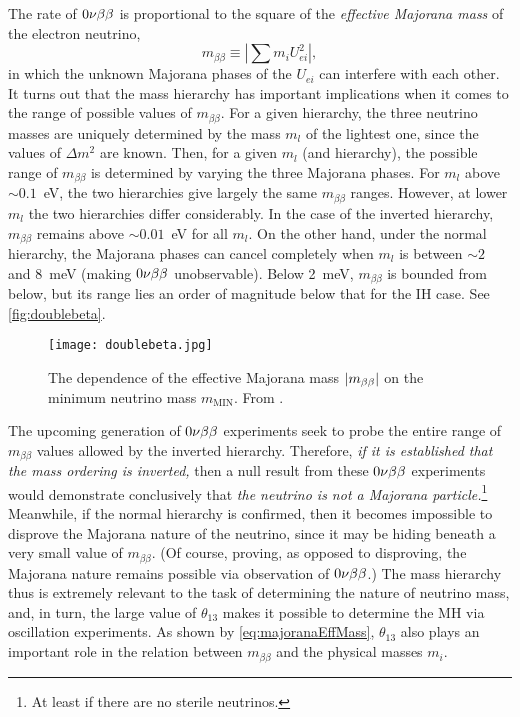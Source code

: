 \documentclass[../thesis.tex]{subfiles}
\begin{document}
The rate of $0\nu\beta\beta$ is proportional to the square of the \emph{effective Majorana mass} of the electron neutrino,
\begin{equation}
  m_{\beta\beta} \equiv \left| \sum m_i U^2_{ei} \right|,
  \label{eq:majoranaEffMass}
\end{equation}
in which the unknown Majorana phases of the $U_{ei}$ can interfere with each other. It turns out that the mass hierarchy has important implications when it comes to the range of possible values of $m_{\beta\beta}$. For a given hierarchy, the three neutrino masses are uniquely determined by the mass $m_l$ of the lightest one, since the values of $\Delta m^2$ are known. Then, for a given $m_l$ (and hierarchy), the possible range of $m_{\beta\beta}$ is determined by varying the three Majorana phases. For $m_l$ above $\sim0.1$~eV, the two hierarchies give largely the same $m_{\beta\beta}$ ranges. However, at lower $m_l$ the two hierarchies differ considerably. In the case of the inverted hierarchy, $m_{\beta\beta}$ remains above $\sim0.01$~eV for all $m_l$. On the other hand, under the normal hierarchy, the Majorana phases can cancel completely when $m_l$ is between $\sim2$ and 8~meV (making $0\nu\beta\beta$ unobservable). Below 2~meV, $m_{\beta\beta}$ is bounded from below, but its range lies an order of magnitude below that for the IH case. See \autoref{fig:doublebeta}.

\begin{figure}[h]
  \texttt{[image: doublebeta.jpg]}
  \caption{The dependence of the effective Majorana mass $\lvert m_{\beta\beta}\rvert$ on the minimum neutrino mass $m_{\mathrm{MIN}}$. From \cite{giuliani2020double}.}
  \label{fig:doublebeta}
\end{figure}


The upcoming generation of $0\nu\beta\beta$ experiments seek to probe the entire range of $m_{\beta\beta}$ values allowed by the inverted hierarchy. Therefore, \emph{if it is established that the mass ordering is inverted,} then a null result from these $0\nu\beta\beta$ experiments would demonstrate conclusively that \emph{the neutrino is not a Majorana particle.}\footnote{At least if there are no sterile neutrinos.} Meanwhile, if the normal hierarchy is confirmed, then it becomes impossible to disprove the Majorana nature of the neutrino, since it may be hiding beneath a very small value of $m_{\beta\beta}$. (Of course, proving, as opposed to disproving, the Majorana nature remains possible via observation of $0\nu\beta\beta$.) The mass hierarchy thus is extremely relevant to the task of determining the nature of neutrino mass, and, in turn, the large value of $\theta_{13}$ makes it possible to determine the MH via oscillation experiments. As shown by \autoref{eq:majoranaEffMass}, $\theta_{13}$ also plays an important role in the relation between $m_{\beta\beta}$ and the physical masses $m_i$.
\end{document}
